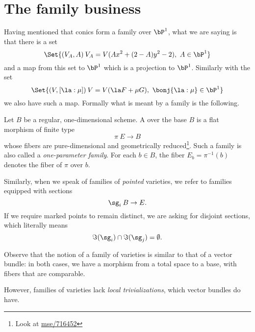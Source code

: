 \section{The family business}

Having mentioned that conics form a family over $\bP^1$, what we are saying is that there is a set
$$\Set{(V_A,A)\: V_A=V(Ax^2+(2-A)y^2-2),\ A\in\bP^1}$$
and a map from this set to $\bP^1$ which is a projection to $\bP^1$. Similarly with the set 
$$\Set{(V,[\la:\mu])\: V=V(\la F+\mu G),\ \bonj{\la:\mu}\in\bP^1}$$
we also have such a map. Formally what is meant by a family is the following.

\begin{Def}[J. Kóllar]
Let $B$ be a regular, one-dimensional scheme. A  over the base $B$ is a flat morphism of finite type
$$\pi\: E\to B$$
whose fibers are pure-dimensional and geometrically reduced\footnote{Look at \href{https://math.stackexchange.com/questions/716452/geometrically-reduced-variety}{mse/716452}}. Such a family is also called a \emph{one-parameter family}. For each $b \in B$, the fiber $E_b = \pi^{-1}(b)$ denotes the fiber of $\pi$ over $b$.
\end{Def}

Similarly, when we speak of families of \emph{pointed} varieties, we refer to families equipped with sections
$$\sg_i\: B\to E.$$
If we require marked points to remain distinct, we are asking for disjoint sections, which literally means
$$\Im(\sg_i)\cap\Im(\sg_j)=\emptyset.$$

\begin{Rmk} 
    Observe that the notion of a family of varieties is similar to that of a vector bundle: in both cases, we have a morphism from a total space to a base, with fibers that are comparable.\par
    However, families of varieties lack \emph{local trivializations}, which vector bundles do have. 
\end{Rmk}

